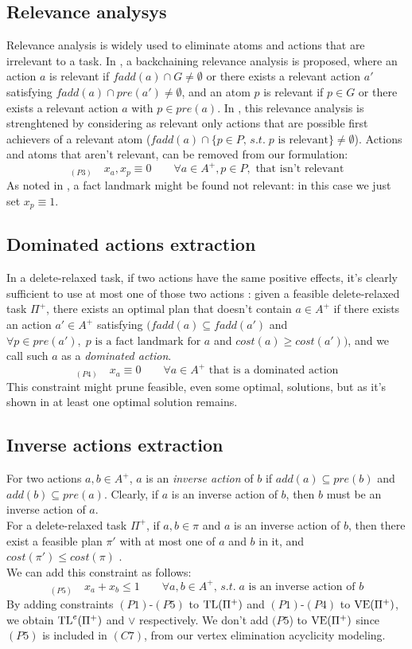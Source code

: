 \subsection{Relevance analysys}
Relevance analysis is widely used to eliminate atoms and actions that are irrelevant to a task. In \cite{Imai_15}, a backchaining relevance analysis is proposed, where an action $a$ is relevant if $fadd(a)\cap G\not=\emptyset$ or there exists a relevant action $a'$ satisfying $fadd(a)\cap pre(a')\not=\emptyset$, and an atom $p$ is relevant if $p\in G$ or there exists a relevant action $a$ with $p\in pre(a)$.
In \cite{MLM_Haslum_12}, this relevance analysis is strenghtened by considering as relevant only actions that are possible first achievers of a relevant atom ($fadd(a)\cap\{p\in P,\,s.t.\;p\mbox{ is relevant}\}\not=\emptyset$).
Actions and atoms that aren't relevant, can be removed from our formulation:
$$_{(P3)}\quad x_a,x_p\equiv0\qquad\forall a\in A^+,p\in P,\mbox{ that isn't relevant}$$
As noted in \cite{Imai_15}, a fact landmark might be found not relevant: in this case we just set $x_p\equiv1$.

\subsection{Dominated actions extraction}
In a delete-relaxed task, if two actions have the same positive effects, it's clearly sufficient to use at most one of those two actions \cite{Imai_15}: given a feasible delete-relaxed task $\Pi^+$, there exists an optimal plan that doesn't contain $a\in A^+$ if there exists an action $a'\in A^+$ satisfying $(fadd(a)\subseteq fadd(a')$ and $\forall p\in pre(a'),\;p\mbox{ is a fact landmark for }a$ and $cost(a)\geq cost(a'))$, and we call such $a$ as a \textit{dominated action}.
$$_{(P4)}\quad x_a\equiv0\qquad\forall a\in A^+\mbox{ that is a dominated action}$$
This constraint might prune feasible, even some optimal, solutions, but as it's shown in \cite{Imai_15} at least one optimal solution remains. 

\subsection{Inverse actions extraction}
For two actions $a,b\in A^+$, $a$ is an \textit{inverse action} of $b$ if $add(a)\subseteq pre(b)$ and $add(b)\subseteq pre(a)$.
Clearly, if $a$ is an inverse action of $b$, then $b$ must be an inverse action of $a$.\\
For a delete-relaxed task $\Pi^+$, if $a,b\in\pi$ and $a$ is an inverse action of $b$, then there exist a feasible plan $\pi'$ with at most one of $a$ and $b$ in it, and $cost(\pi')\leq cost(\pi)$ \cite{Imai_15}.\\
We can add this constraint as follows:
$$_{(P5)}\quad x_a+x_b\leq1\qquad\forall a,b\in A^+,\,s.t.\;a\mbox{ is an inverse action of }b$$
By adding constraints $(P1)$-$(P5)$ to $\mbox{TL}(\Pi^+)$ and $(P1)$-$(P4)$ to $\mbox{VE}(\Pi^+)$, we obtain $\mbox{TL}^e(\Pi^+)$ and $\vee$ respectively. We don't add $(P5$) to $\mbox{VE}(\Pi^+)$ since $(P5)$ is included in $(C7)$, from our vertex elimination acyclicity modeling.
